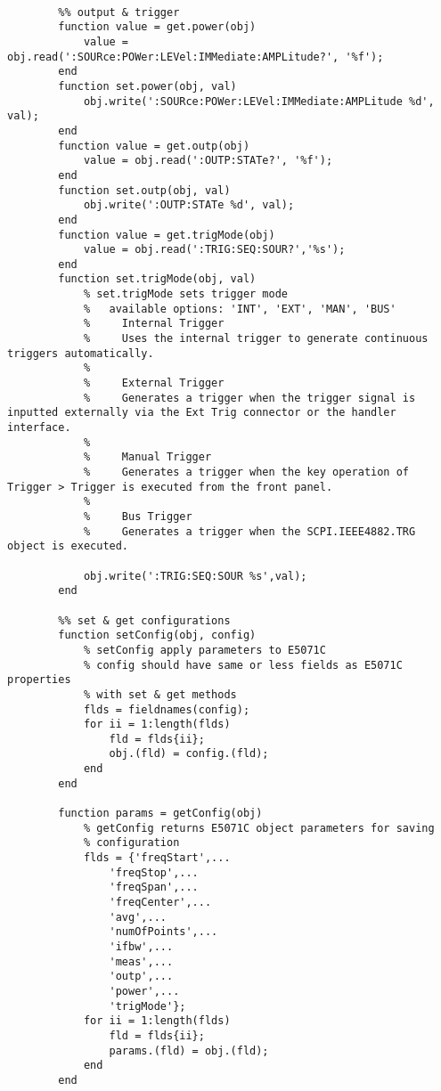 \begin{lstlisting}
        
        %% output & trigger
        function value = get.power(obj)
            value = obj.read(':SOURce:POWer:LEVel:IMMediate:AMPLitude?', '%f');
        end
        function set.power(obj, val)
            obj.write(':SOURce:POWer:LEVel:IMMediate:AMPLitude %d', val);
        end
        function value = get.outp(obj)
            value = obj.read(':OUTP:STATe?', '%f');
        end
        function set.outp(obj, val)
            obj.write(':OUTP:STATe %d', val);
        end
        function value = get.trigMode(obj)
            value = obj.read(':TRIG:SEQ:SOUR?','%s');
        end
        function set.trigMode(obj, val)
            % set.trigMode sets trigger mode
            %   available options: 'INT', 'EXT', 'MAN', 'BUS'
            %     Internal Trigger
            %     Uses the internal trigger to generate continuous triggers automatically.
            % 
            %     External Trigger
            %     Generates a trigger when the trigger signal is inputted externally via the Ext Trig connector or the handler interface.
            % 
            %     Manual Trigger
            %     Generates a trigger when the key operation of Trigger > Trigger is executed from the front panel.
            % 
            %     Bus Trigger
            %     Generates a trigger when the SCPI.IEEE4882.TRG object is executed.

            obj.write(':TRIG:SEQ:SOUR %s',val);
        end
        
        %% set & get configurations
        function setConfig(obj, config)
            % setConfig apply parameters to E5071C
            % config should have same or less fields as E5071C properties
            % with set & get methods
            flds = fieldnames(config);
            for ii = 1:length(flds)
                fld = flds{ii};
                obj.(fld) = config.(fld);
            end
        end
        
        function params = getConfig(obj)
            % getConfig returns E5071C object parameters for saving
            % configuration
            flds = {'freqStart',...
                'freqStop',...
                'freqSpan',...
                'freqCenter',...
                'avg',...
                'numOfPoints',...
                'ifbw',...
                'meas',...
                'outp',...
                'power',...
                'trigMode'};            
            for ii = 1:length(flds)
                fld = flds{ii};
                params.(fld) = obj.(fld);
            end
        end
        

\end{lstlisting}
